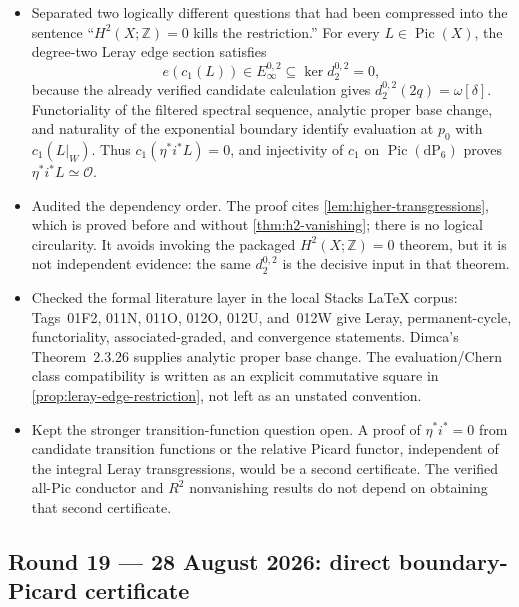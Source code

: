 \begin{itemize}[leftmargin=1.8em]
\item Separated two logically different questions that had been compressed
into the sentence ``$H^2(X;\mathbb Z)=0$ kills the restriction.''  For every
$L\in\operatorname{Pic}(X)$, the degree-two Leray edge section satisfies
\[
 e(c_1(L))\in E_\infty^{0,2}\subseteq\ker d_2^{0,2}=0,
\]
because the already verified candidate calculation gives
$d_2^{0,2}(2q)=\omega[\delta]$.  Functoriality of the filtered spectral
sequence, analytic proper base change, and naturality of the exponential
boundary identify evaluation at $p_0$ with $c_1(L|_W)$.  Thus
$c_1(\eta^*i^*L)=0$, and injectivity of $c_1$ on
$\operatorname{Pic}(\mathrm{dP}_6)$ proves
$\eta^*i^*L\simeq\mathcal O$.
\item Audited the dependency order.  The proof cites
\cref{lem:higher-transgressions}, which is proved before and without
\cref{thm:h2-vanishing}; there is no logical circularity.  It avoids invoking
the packaged $H^2(X;\mathbb Z)=0$ theorem, but it is not independent evidence:
the same $d_2^{0,2}$ is the decisive input in that theorem.
\item Checked the formal literature layer in the local Stacks LaTeX corpus:
Tags~01F2, 011N, 011O, 012O, 012U, and~012W give Leray, permanent-cycle,
functoriality, associated-graded, and convergence statements.  Dimca's
Theorem~2.3.26 supplies analytic proper base change.  The evaluation/Chern
class compatibility is written as an explicit commutative square in
\cref{prop:leray-edge-restriction}, not left as an unstated convention.
\item Kept the stronger transition-function question open.  A proof of
$\eta^*i^*=0$ from candidate transition functions or the relative Picard
functor, independent of the integral Leray transgressions, would be a second
certificate.  The verified all-Pic conductor and $R^2$ nonvanishing results
do not depend on obtaining that second certificate.
\end{itemize}

\subsection*{Round 19 --- 28 August 2026: direct boundary-Picard certificate}


